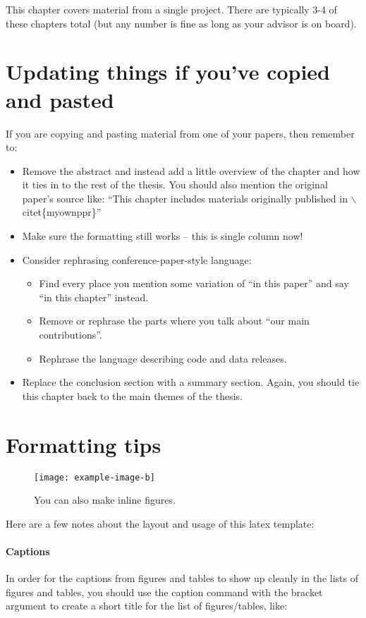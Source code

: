 This chapter covers material from a single project.  There are typically 3-4 of these chapters total (but any number is fine as long as your advisor is on board).


\section{Updating things if you've copied and pasted}
If you are copying and pasting material from one of your papers, then remember to:
\begin{itemize}
    \item Remove the abstract and instead add a little overview of the chapter and how it ties in to the rest of the thesis. You should also mention the original paper's source like: ``This chapter includes materials originally published in $\backslash$citet\{myownppr\}''
    \item Make sure the formatting still works -- this is single column now!
    \item Consider rephrasing conference-paper-style language:
    \begin{itemize}
        \item Find every place you mention some variation of ``in this paper'' and say ``in this chapter'' instead.
        \item Remove or rephrase the parts where you talk about ``our main contributions''.
        \item Rephrase the language describing code and data releases.
    \end{itemize}
    \item Replace the conclusion section with a summary section. Again, you should tie this chapter back to the main themes of the thesis.
\end{itemize}


\section{Formatting tips}
\begin{wrapfigure}{r}{0.3\textwidth}
    \centering
    \texttt{[image: example-image-b]}
    \caption[Short title for wrapfigure]{You can also make inline figures.}
    \label{chap2:fig:ex2}
\end{wrapfigure}

Here are a few notes about the layout and usage of this latex template:

\paragraph{Captions} In order for the captions from figures and tables to show up cleanly in the lists of figures and tables, you should use the caption command with the bracket argument to create a short title for the list of figures/tables, like:


